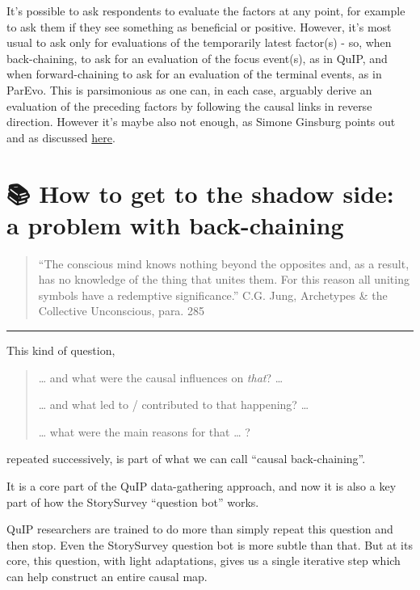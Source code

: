 \documentclass[
]{book}
\begin{document}
It's possible to ask respondents to evaluate the factors at any point, for example to ask them if they see something as beneficial or positive. However, it's most usual to ask only for evaluations of the temporarily latest factor(s) - so, when back-chaining, to ask for an evaluation of the focus event(s), as in QuIP, and when forward-chaining to ask for an evaluation of the terminal events, as in ParEvo. This is parsimonious as one can, in each case, arguably derive an evaluation of the preceding factors by following the causal links in reverse direction. However it's maybe also not enough, as Simone Ginsburg points out and as discussed \href{https://journals.sfu.ca/jmde/index.php/jmde_1/article/view/563}{here}.

\hypertarget{how-to-get-to-the-shadow-side-a-problem-with-back-chaining}{%
\chapter{📚 How to get to the shadow side: a problem with back-chaining}\label{how-to-get-to-the-shadow-side-a-problem-with-back-chaining}}

\begin{quote}
``The conscious mind knows nothing beyond the opposites and, as a result, has no knowledge of the thing that unites them. For this reason all uniting symbols have a redemptive significance.'' C.G. Jung, Archetypes \& the Collective Unconscious, para. 285
\end{quote}

\begin{center}\rule{0.5\linewidth}{0.5pt}\end{center}

This kind of question,

\begin{quote}
\ldots{} and what were the causal influences on \emph{that}? \ldots{}

\ldots{} and what led to / contributed to that happening? \ldots{}

\ldots{} what were the main reasons for that \ldots{} ?
\end{quote}

repeated successively, is part of what we can call ``causal back-chaining''.

It is a core part of the QuIP data-gathering approach, and now it is also a key part of how the StorySurvey ``question bot'' works.

QuIP researchers are trained to do more than simply repeat this question and then stop. Even the StorySurvey question bot is more subtle than that. But at its core, this question, with light adaptations, gives us a single iterative step which can help construct an entire causal map.
\end{document}

